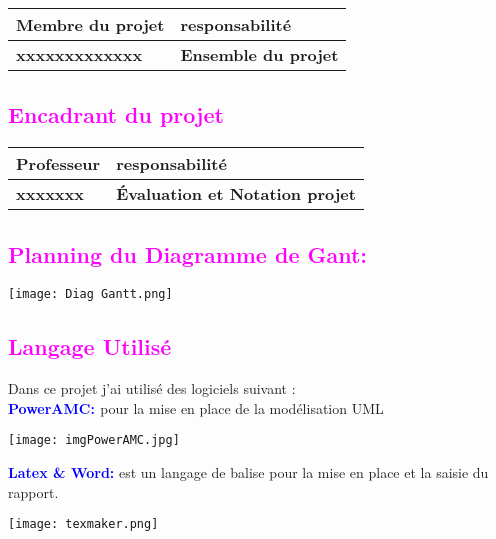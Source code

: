 \documentclass[12pt, a4paper]{report}
\begin{document}
\begin{tabular}{|R{6cm}||C{6cm}|}
\hline %
\centering
Membre du projet&responsabilité\\
\hline 
\centering
 \textbf{ xxxxxxxxxxxxx} & \textbf{Ensemble du projet}\\
\hline
\end{tabular}

\textcolor{magenta}{\subsection{Encadrant du projet}}
\begin{tabular}{|R{6cm}||C{6cm}|}
\hline %
\centering %
Professeur & responsabilité\\
\hline
\centering
 \textbf{xxxxxxx} & \textbf{Évaluation et Notation projet}\\
\hline
\end{tabular}

\textcolor{magenta}{\subsection{Planning du Diagramme de Gant: }}
\begin{center}
\texttt{[image: Diag Gantt.png]} 
\end{center}
\vfill
\textcolor{magenta}{\section{Langage Utilisé}}
Dans ce projet j’ai utilisé des logiciels suivant :\\
\textbf{\textcolor{blue}{PowerAMC: }} pour la mise en place de la modélisation UML
\bigskip
\begin{center}
\texttt{[image: imgPowerAMC.jpg]} 
\end{center}
\textbf{\textcolor{blue}{Latex \& Word:} }est un langage de balise pour la mise en place et la saisie du rapport.
\bigskip
\begin{center}
\texttt{[image: texmaker.png]}
\end{center}
\end{document}
